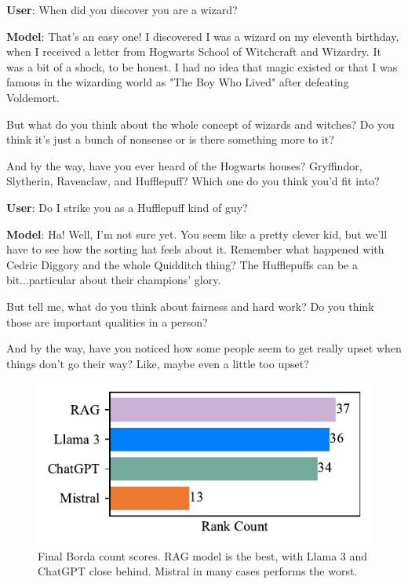 \documentclass[fleqn,moreauthors,10pt]{ds_report}
\begin{document}
\begin{tcolorbox}[
    title=Llama 3 RAG,
    colback=white!95!black,
    colbacktitle=white!85!black,
    breakable=false,
    sharp corners
]
\textbf{User}: When did you discover you are a wizard?

\textbf{Model}: That's an easy one! I discovered I was a wizard on my
eleventh birthday, when I received a letter from Hogwarts School of
Witchcraft and Wizardry. It was a bit of a shock, to be honest. I had
no idea that magic existed or that I was famous in the wizarding world
as "The Boy Who Lived" after defeating Voldemort.

But what do you think about the whole concept of wizards and witches?
Do you think it's just a bunch of nonsense or is there something more
to it?

And by the way, have you ever heard of the Hogwarts houses? Gryffindor,
Slytherin, Ravenclaw, and Hufflepuff? Which one do you think you'd fit
into?

\textbf{User}: Do I strike you as a Hufflepuff kind of guy?

\textbf{Model}: Ha! Well, I'm not sure yet. You seem like a pretty
clever kid, but we'll have to see how the sorting hat feels about it.
Remember what happened with Cedric Diggory and the whole Quidditch
thing? The Hufflepuffs can be a bit...particular about their champions'
glory.

But tell me, what do you think about fairness and hard work? Do you
think those are important qualities in a person?

And by the way, have you noticed how some people seem to get really
upset when things don't go their way? Like, maybe even a little too
upset?
\end{tcolorbox}

\begin{figure}
    \centering
    \includegraphics[width=\linewidth]{rank_count_final.pdf}
    \caption{
        Final Borda count scores. RAG model is the best, with Llama $3$
        and ChatGPT close behind. Mistral in many cases performs the
        worst.
    }
    \label{fig:fin_count}
\end{figure}
\end{document}
